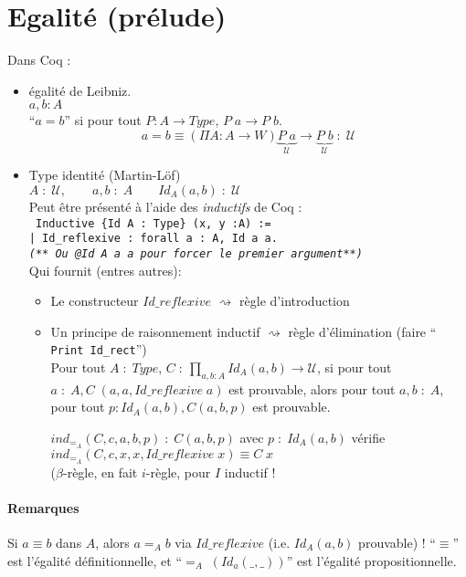 \documentclass{article}
\begin{document}
\section{Egalité (prélude)}
Dans Coq : 
\begin{itemize}[label=$\star$]
\item égalité de Leibniz.\\
$a, b : A$\\
``$a=b$'' si pour tout $P: A \to Type$, $P\; a \to P \; b$.
\[ a=b \equiv (\Pi A : A \to W) \underbrace{P\; a}_{\mathcal{U}} \to \underbrace{P\; b}_{\mathcal{U}} \;: \;\mathcal{U} \]
\item Type identité (Martin-Löf)\\
$A\; : \; \mathcal{U}, \qquad a,b \;:\; A\qquad Id_A (a,b)\; :\; \mathcal{U}$\\
Peut être présenté à l'aide des \emph{inductifs} de Coq :\\
\texttt{
Inductive \{Id A : Type\} (x, y :A) := \\
 | Id\_reflexive : forall a : A, Id a a.\\
 \textit{(** Ou @Id A a a pour forcer le premier argument**)}
}\\
Qui fournit (entres autres):
\begin{itemize}
\item Le constructeur $Id\_reflexive$ $\rightsquigarrow$ règle d'introduction
\begin{prooftree}
\end{prooftree}
\item Un principe de raisonnement inductif $\rightsquigarrow$ règle d'élimination (faire ``
\texttt{Print Id\_rect}'')\\
Pour tout $A\;:\; Type$, $C\; : \: \prod_{a,b : A} Id_A(a,b) \to \mathcal{U}$, si pour tout $a\;:\;A, C\; (a,a,Id\_reflexive\; a)$ est prouvable, alors pour tout $a,b\;:\; A$, pour tout $p:Id_A(a,b),C(a,b,p)$ est prouvable.

$ind_{=_A}(C,c,a,b,p)\;:\; C(a,b,p)$ avec $p\;:\; Id_A(a,b)$ vérifie $ind_{=_A}(C,c,x,x,Id\_reflexive\; x)\equiv C\; x$\\
($\beta$-règle, en fait $i$-règle, pour $I$ inductif !
\end{itemize}
\end{itemize}

\paragraph{Remarques}
Si $a\equiv b$ dans $A$, alors $a=_A b$ via $Id\_reflexive$ (i.e. $Id_A(a,b)$ prouvable) ! ``$\equiv$'' est l'égalité définitionnelle, et ``$=_A\; (Id_a(\_,\_))$'' est l'égalité propositionnelle.
\end{document}
